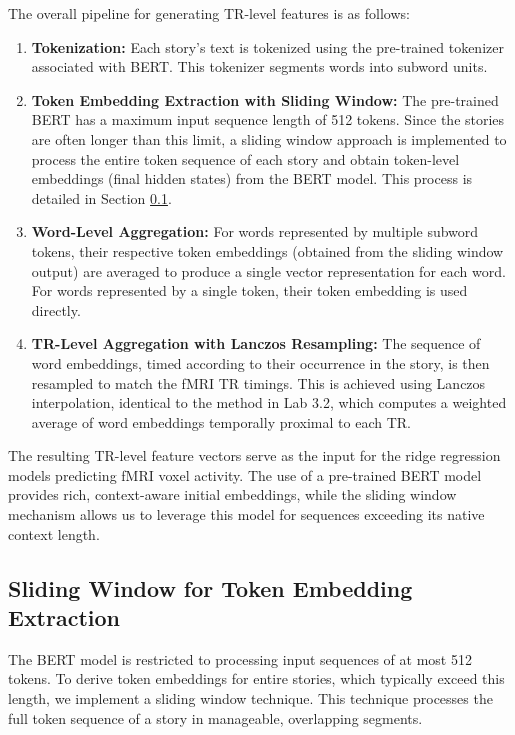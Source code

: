 \documentclass[10pt,letterpaper]{article}
\begin{document}
The overall pipeline for generating TR-level features is as follows:
\begin{enumerate}
    \item \textbf{Tokenization:} Each story's text is tokenized using the pre-trained tokenizer associated with BERT. This tokenizer segments words into subword units.
    \item \textbf{Token Embedding Extraction with Sliding Window:} The pre-trained BERT has a maximum input sequence length of 512 tokens. Since the stories are often longer than this limit, a sliding window approach is implemented to process the entire token sequence of each story and obtain token-level embeddings (final hidden states) from the BERT model. This process is detailed in Section \ref{ssec:sliding_window}.
    \item \textbf{Word-Level Aggregation:} For words represented by multiple subword tokens, their respective token embeddings (obtained from the sliding window output) are averaged to produce a single vector representation for each word. For words represented by a single token, their token embedding is used directly.
    \item \textbf{TR-Level Aggregation with Lanczos Resampling:} The sequence of word embeddings, timed according to their occurrence in the story, is then resampled to match the fMRI TR timings. This is achieved using Lanczos interpolation, identical to the method in Lab 3.2, which computes a weighted average of word embeddings temporally proximal to each TR.
\end{enumerate}

The resulting TR-level feature vectors serve as the input for the ridge regression models predicting fMRI voxel activity. The use of a pre-trained BERT model provides rich, context-aware initial embeddings, while the sliding window mechanism allows us to leverage this model for sequences exceeding its native context length.

\subsection{Sliding Window for Token Embedding Extraction}
\label{ssec:sliding_window}

The BERT model is restricted to processing input sequences of at most 512 tokens. To derive token embeddings for entire stories, which typically exceed this length, we implement a sliding window technique. This technique processes the full token sequence of a story in manageable, overlapping segments.
\end{document}
